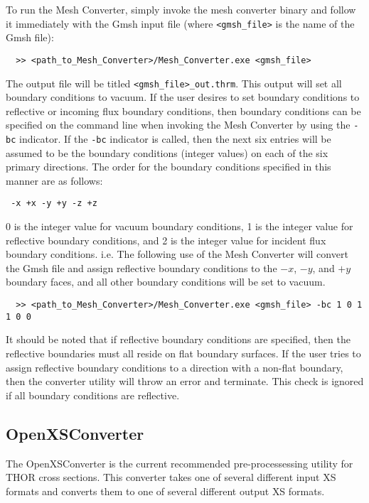 To run the Mesh Converter, simply invoke the mesh converter binary and follow it immediately with the Gmsh input file (where \verb"<gmsh_file>" is the name of the Gmsh file):
\begin{verbatim}
  >> <path_to_Mesh_Converter>/Mesh_Converter.exe <gmsh_file>
\end{verbatim}
The output file will be titled \verb"<gmsh_file>_out.thrm".
This output will set all boundary conditions to vacuum.
If the user desires to set boundary conditions to reflective or incoming flux boundary conditions, then boundary conditions can be specified on the command line when invoking the Mesh Converter by using the \verb"-bc" indicator.
If the \verb"-bc" indicator is called, then the next six entries will be assumed to be the boundary conditions (integer values) on each of the six primary directions.
The order for the boundary conditions specified in this manner are as follows:
\begin{verbatim}
 -x +x -y +y -z +z
\end{verbatim}
0 is the integer value for vacuum boundary conditions, 1 is the integer value for reflective boundary conditions, and 2 is the integer value for incident flux boundary conditions.
i.e. The following use of the Mesh Converter will convert the Gmsh file and assign reflective boundary conditions to the $-x$, $-y$, and $+y$ boundary faces, and all other boundary conditions will be set to vacuum.
\begin{verbatim}
  >> <path_to_Mesh_Converter>/Mesh_Converter.exe <gmsh_file> -bc 1 0 1 1 0 0
\end{verbatim}
It should be noted that if reflective boundary conditions are specified, then the reflective boundaries must all reside on flat boundary surfaces.
If the user tries to assign reflective boundary conditions to a direction with a non-flat boundary, then the converter utility will throw an error and terminate.
This check is ignored if all boundary conditions are reflective.

\subsection{OpenXSConverter}\label{ch:getstart:sec:preproc:subsec:xsconv}

The OpenXSConverter is the current recommended pre-processessing utility for \ac{THOR} cross sections.
This converter takes one of several different input \ac{XS} formats and converts them to one of several different output \ac{XS} formats.

